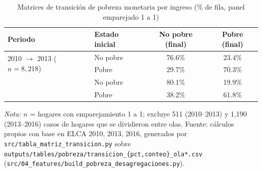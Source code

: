 \begin{table}[H]
  \centering
  \caption{Matrices de transición de pobreza monetaria por ingreso
  (\% de fila, panel emparejado 1 a 1)}
  \label{tab:matriz_transicion}
  \begin{tabular}{llcc}
    \toprule
    \textbf{Periodo} & \textbf{Estado inicial} & \textbf{No pobre (final)} & \textbf{Pobre (final)} \\
    \midrule
    \multirow{2}{*}{2010 $\rightarrow$ 2013 ($n=8{,}218$)}
      & No pobre & 76.6\% & 23.4\% \\
      & Pobre    & 29.7\% & 70.3\% \\
    \addlinespace
    \multirow{2}{*}{2013 $\rightarrow$ 2016 ($n=6{,}911$)}
      & No pobre & 80.1\% & 19.9\% \\
      & Pobre    & 38.2\% & 61.8\% \\
    \bottomrule
  \end{tabular}
  \begin{minipage}{0.85\textwidth}
    \vspace{4pt}
    \footnotesize \textit{Nota:} $n$ = hogares con emparejamiento 1 a 1;
    excluye 511 (2010--2013) y 1{,}190 (2013--2016) casos de hogares que se
    dividieron entre olas. Fuente: cálculos propios con base en ELCA
    2010, 2013, 2016, generados por \texttt{src/tabla\_matriz\_transicion.py}
    sobre \texttt{outputs/tables/pobreza/transicion\_\{pct,conteo\}\_ola*.csv}
    (\texttt{src/04\_features/build\_pobreza\_desagregaciones.py}).
  \end{minipage}
\end{table}